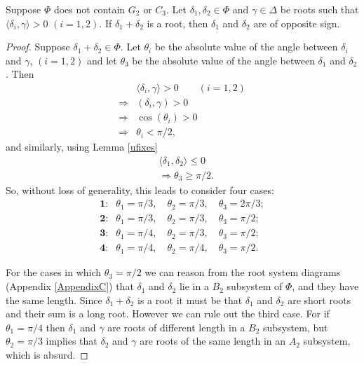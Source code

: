 \begin{lemma} \label{uabelian}
Suppose $\Phi$ does not contain $G_2$ or $C_3$. Let $\delta_1, \delta_2 \in \Phi$ and $\gamma \in \Delta$ be roots such that $\langle \delta_i, \gamma \rangle > 0$ $(i = 1, 2)$. If $\delta_1 + \delta_2$ is a root, then $\delta_1$ and $\delta_2$ are of opposite sign.
\end{lemma}
\begin{proof}
Suppose $\delta_1 + \delta_2 \in \Phi$. Let $\theta_i$ be the absolute value of the angle between $\delta_i$ and $\gamma$, $(i = 1,2)$ and let $\theta_3$ be the absolute value of the angle between $\delta_1$ and $\delta_2$. Then
\begin{align*}
&\langle \delta_i, \gamma\rangle > 0 \qquad (i=1,2) \\
\Longrightarrow &(\delta_i, \gamma) > 0 \\
\Longrightarrow &\cos(\theta_i) > 0 \\
\Longrightarrow &\theta_i < \pi/2,
\end{align*}
and similarly, using Lemma \ref{ufixes}
\begin{align*}
&\langle \delta_1, \delta_2 \rangle \leq 0 \\
&\Longrightarrow \theta_3 \geq \pi/2.
\end{align*}
So, without loss of generality, this leads to consider four cases:
\begin{align*}
\textbf{1:}&\theta_1 = \pi/3,\quad\theta_2 = \pi/3,\quad\theta_3 = 2\pi/3; \\
\textbf{2:}&\theta_1 = \pi/3,\quad\theta_2 = \pi/3,\quad\theta_3 = \pi/2; \\
\textbf{3:}&\theta_1 = \pi/4,\quad\theta_2 = \pi/3,\quad\theta_3 = \pi/2; \\
\textbf{4:}&\theta_1 = \pi/4,\quad\theta_2 = \pi/4,\quad\theta_3 = \pi/2.
\end{align*}

For the cases in which $\theta_3 = \pi/2$ we can reason from the root system diagrams (Appendix \ref{AppendixC}) that $\delta_1$ and $\delta_2$ lie in a $B_2$ subsystem of $\Phi$, and they have the same length. Since $\delta_1+\delta_2$ is a root it must be that $\delta_1$ and $\delta_2$ are short roots and their sum is a long root. However we can rule out the third case. For if $\theta_1 = \pi/4$ then $\delta_1$ and $\gamma$ are roots of different length in a $B_2$ subsystem, but $\theta_2 = \pi/3$ implies that $\delta_2$ and $\gamma$ are roots of the same length in an $A_2$ subsystem, which is absurd.


\end{proof}
